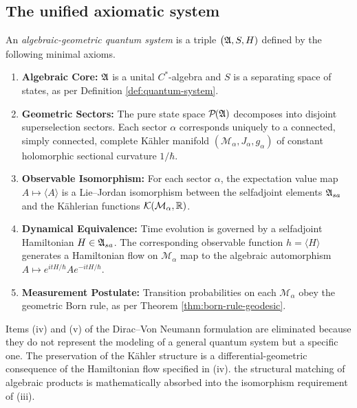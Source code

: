 \subsection*{The unified axiomatic system}

\begin{definition}
	\label{def:schrodinger-quantum-system}
	An \emph{algebraic-geometric quantum system} is a triple $\big(\mathfrak{A}, S, H)$ defined by the following minimal axioms.
	\begin{enumerate}[label=(\roman*)]
		\item \textbf{Algebraic Core:} $\mathfrak{A}$ is a unital $C^*$-algebra and $S$ is a separating space of states, as per Definition \ref{def:quantum-system}. 
		\item \textbf{Geometric Sectors:} The pure state space $\mathcal{P}(\A)$ decomposes into disjoint superselection sectors. Each sector $\alpha$ corresponds uniquely to a connected, simply connected, complete Kähler manifold $(\mathcal{M}_\alpha, J_\alpha, g_\alpha)$ of constant holomorphic sectional curvature $1/\hbar$. 
		\item \textbf{Observable Isomorphism:} For each sector $\alpha$, the expectation value map $A \mapsto \langle A \rangle$ is a Lie--Jordan isomorphism between the selfadjoint elements $\mathfrak{A}_{sa}$ and the Kählerian functions $\mathcal{K}(\mathcal{M}_\alpha, \R)$. 
		\item \textbf{Dynamical Equivalence:} Time evolution is governed by a selfadjoint Hamiltonian $H \in \mathfrak{A}_{sa}$. The corresponding observable function $h = \langle H \rangle$ generates a Hamiltonian flow on $\mathcal{M}_\alpha$ map to the algebraic automorphism $A \mapsto e^{itH/\hbar} A e^{-itH/\hbar}$.
		\item \textbf{Measurement Postulate:} Transition probabilities on each $\mathcal{M}_\alpha$ obey the geometric Born rule, as per Theorem \ref{thm:born-rule-geodesic}. 
	\end{enumerate}
\end{definition}

\noindent Items (iv) and (v) of the Dirac--Von Neumann formulation are eliminated because they do not represent the modeling of a general quantum system but a specific one. The preservation of the Kähler structure is a differential-geometric consequence of the Hamiltonian flow specified in (iv). the structural matching of algebraic products is mathematically absorbed into the isomorphism requirement of (iii).

